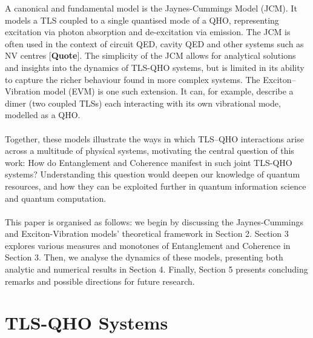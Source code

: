 \documentclass[12pt]{article}
\begin{document}
A canonical and fundamental model is the Jaynes-Cummings Model (JCM). It models a TLS coupled to a single quantised mode of a QHO, representing excitation via photon absorption and de-excitation via emission. The JCM is often used in the context of circuit QED, cavity QED and other systems such as NV centres [\textbf{Quote}]. The simplicity of the JCM allows for analytical solutions and insights into the dynamics of TLS-QHO systems, but is limited in its ability to capture the richer behaviour found in more complex systems. The Exciton–Vibration model (EVM) is one such extension. It can, for example, describe a dimer (two coupled TLSs) each interacting with its own vibrational mode, modelled as a QHO.\\
\\
Together, these models illustrate the ways in which TLS–QHO interactions arise across a multitude of physical systems, motivating the central question of this work: How do Entanglement and Coherence manifest in such joint TLS-QHO systems? Understanding this question would deepen our knowledge of quantum resources, and how they can be exploited further in quantum information science and quantum computation. \\
\\
This paper is organised as follows: we begin by discussing the Jaynes-Cummings and Exciton-Vibration models' theoretical framework in Section 2. Section 3 explores various measures and monotones of Entanglement and Coherence in Section 3. Then, we analyse the dynamics of these models, presenting both analytic and numerical results in Section 4. Finally, Section 5 presents concluding remarks and possible directions for future research.





























\newpage
\section{TLS-QHO Systems}
\end{document}
